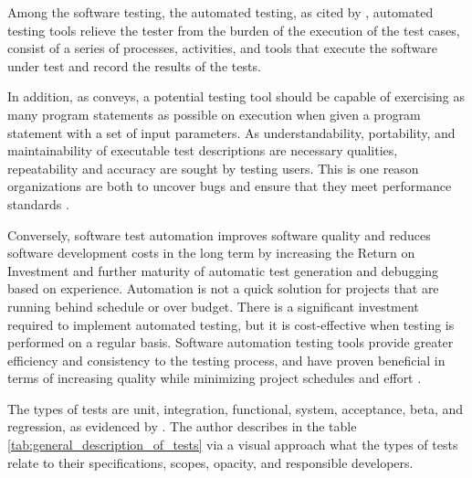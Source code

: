 Among the software testing, the automated testing, as cited by
\cite{khaliq2022artificial, pocatilu2002automated}, automated testing tools relieve the tester from the burden of the execution of the test cases, consist of a series of processes, activities, and tools that execute the software under test and record the results of the tests.

In addition, as  conveys, a potential testing tool should be capable of 
exercising as many program statements as possible on execution when given a program statement with a set of input parameters. As understandability, portability, and maintainability of executable test descriptions are necessary qualities, repeatability and accuracy are sought by testing users. This is one reason organizations are both to uncover bugs and ensure 
that they meet performance standards \cite{abo2023role}. 

Conversely, software test automation improves software quality and reduces software development costs in the long term by increasing the Return on Investment and further maturity of automatic test generation and debugging based on experience. Automation is not a quick solution for projects that are running behind schedule or over budget. There is a significant investment required to implement automated testing, but it is cost-effective when testing is performed on a regular basis. Software automation testing
 tools provide greater efficiency and consistency to the testing process, and have proven beneficial in terms of increasing quality while minimizing project schedules and effort \cite{abo2023role, huang2003automated}.

The types of tests are unit, integration, functional, system, acceptance, beta, and regression, as evidenced by \cite{meenakshi2014software}. The author describes in the table \ref{tab:general_description_of_tests} via a visual approach what the types of tests relate to their specifications, scopes, opacity, and responsible developers.

